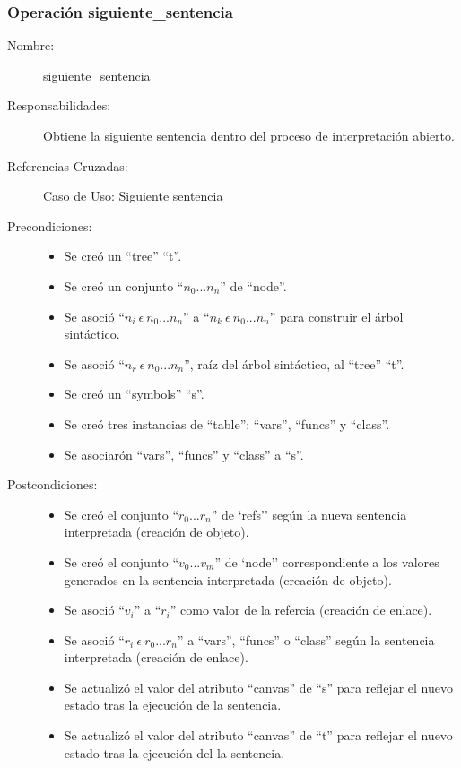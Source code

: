 \subsubsection{Operación siguiente\_sentencia}
\FloatBarrier
\begin{framed}
	\begin{description}
		\item [Nombre:] siguiente\_sentencia
		\item [Responsabilidades:] Obtiene la siguiente sentencia dentro del proceso de interpretación abierto.
		\item [Referencias Cruzadas: ] Caso de Uso: Siguiente sentencia
      \item [Precondiciones:] \hfill
         \begin {itemize}
         \item Se creó un ``tree'' ``t''.
         \item Se creó un conjunto ``$n_0...n_n$'' de ``node''.
         \item Se asoció ``$n_i\ \epsilon\ n_0...n_n$'' a ``$n_k\ \epsilon\ n_0...n_n$'' para construir el árbol sintáctico.
         \item Se asoció  ``$n_r\ \epsilon\ n_0...n_n$'', raíz del árbol sintáctico, al ``tree'' ``t''.
         \item Se creó un ``symbols'' ``s''.
         \item Se creó tres instancias de ``table'': ``vars'', ``funcs'' y ``class''.
         \item Se asociarón ``vars'', ``funcs'' y ``class'' a ``s''.
      \end{itemize}
      \item [Postcondiciones:] \hfill
      \begin {itemize}
         \item Se creó el conjunto ``$r_0...r_n$'' de `refs'' según la nueva sentencia interpretada (creación de objeto).
         \item Se creó el conjunto ``$v_0...v_m$'' de `node'' correspondiente a los valores generados en la sentencia  interpretada (creación de objeto).
         \item Se asoció ``$v_i$'' a ``$r_i$'' como valor de la refercia (creación de enlace).
         \item Se asoció ``$r_i\ \epsilon \ r_0...r_n$'' a ``vars'', ``funcs'' o ``class'' según la sentencia interpretada (creación de enlace).  
         \item Se actualizó el valor del atributo ``canvas'' de ``s'' para reflejar el nuevo estado tras la ejecución de la sentencia.
         \item Se actualizó el valor del atributo ``canvas'' de ``t'' para reflejar el nuevo estado tras la ejecución del la sentencia.
      \end{itemize}
	\end{description}
\end{framed}
\FloatBarrier

